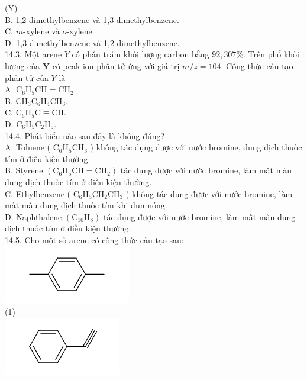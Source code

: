 \documentclass[10pt]{article}
\begin{document}
(Y)\\
B. 1,2-dimethylbenzene và 1,3-dimethylbenzene.\\
C. $m$-xylene và $o$-xylene.\\
D. 1,3-dimethylbenzene và 1,2-dimethylbenzene.\\
14.3. Một arene $Y$ có phần trăm khối lượng carbon bằng $92,307 \%$. Trên phổ khối lượng của $\mathbf{Y}$ có peak ion phân tử ứng với giá trị $m / z=104$. Công thức cấu tạo phân tử của $Y$ là\\
A. $\mathrm{C}_{6} \mathrm{H}_{5} \mathrm{CH}=\mathrm{CH}_{2}$.\\
B. $\mathrm{CH}_{3} \mathrm{C}_{6} \mathrm{H}_{4} \mathrm{CH}_{3}$.\\
C. $\mathrm{C}_{6} \mathrm{H}_{5} \mathrm{C} \equiv \mathrm{CH}$.\\
D. $\mathrm{C}_{6} \mathrm{H}_{5} \mathrm{C}_{2} \mathrm{H}_{5}$.\\
14.4. Phát biểu nào sau đây là không đúng?\\
A. Toluene ( $\mathrm{C}_{6} \mathrm{H}_{5} \mathrm{CH}_{3}$ ) không tác dụng được với nước bromine, dung dịch thuốc tím ở điều kiện thường.\\
B. Styrene $\left(\mathrm{C}_{6} \mathrm{H}_{5} \mathrm{CH}=\mathrm{CH}_{2}\right)$ tác dụng được với nước bromine, làm mât màu dung dịch thuốc tím ở điều kiện thường.\\
C. Ethylbenzene ( $\mathrm{C}_{6} \mathrm{H}_{5} \mathrm{CH}_{2} \mathrm{CH}_{3}$ ) không tác dụng được với nước bromine, làm mất màu dung dịch thuốc tím khi đun nóng.\\
D. Naphthalene $\left(\mathrm{C}_{10} \mathrm{H}_{8}\right)$ tác dụng được với nước bromine, làm mất màu dung dịch thuốc tím ở điều kiện thường.\\
14.5. Cho một số arene có công thức cấu tạo sau:\\
\includegraphics{smile-0154655c5f83b3260af9018489c100935dc1dbab}\\
(1)\\
\includegraphics{smile-ff8505c1b846bfffff80f00c5e2bb34e2b64192c}\\
\end{document}
